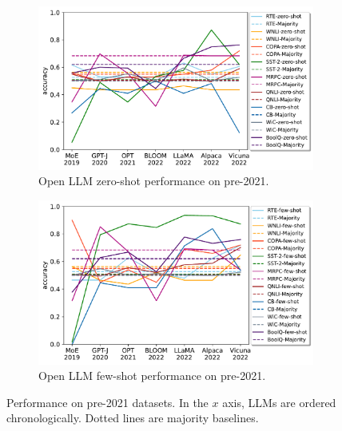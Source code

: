 \documentclass[letterpaper]{article} %
\newcommand{\jmf}[1]{}      %
\newcommand{\jmfb}[1]{}      %
\begin{document}
\begin{figure}[t]
\begin{subfigure}[b]{0.45\textwidth}
            \includegraphics[scale=0.38]{img/output-zero-shot-old-dataset-recent-llm.pdf}
            \caption[]%
            {{Open LLM zero-shot performance on pre-2021.\jmfb{My guess is OPT probably does better than davinci because of the weighting of the datasets during training}}}
            \label{fig:Zero shot performance for old datasets}
        \end{subfigure}
        \hfill
        \begin{subfigure}[b]{0.45\textwidth}
            \centering
            \includegraphics[scale=0.38]{img/output-few-shot-old-dataset-recent-llm.pdf}
            \caption[]%
            {Open LLM few-shot performance on pre-2021. \jmf{five shots}\jmfb{why does is it so good on sst? I think because it's true few shot learning }}
            \label{fig:Few shot performance for old datasets}
        \end{subfigure}
        \caption[]
        {Performance on pre-2021 datasets. In the $x$ axis, LLMs are ordered chronologically. Dotted lines are majority baselines.}
        \label{fig:experiments-zero-shot}
    \end{figure}
\end{document}
